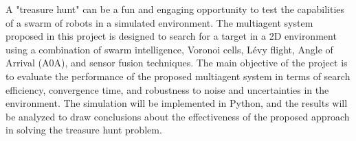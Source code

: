 A "treasure hunt" can be a fun and engaging opportunity to test the capabilities of a swarm of robots in a simulated environment. The multiagent system proposed in this project is designed to search for a target in a 2D environment using a combination of swarm intelligence, Voronoi cells, Lévy flight, Angle of Arrival (A0A), and sensor fusion techniques. The main objective of the project is to evaluate the performance of the proposed multiagent system in terms of search efficiency, convergence time, and robustness to noise and uncertainties in the environment. The simulation will be implemented in Python, and the results will be analyzed to draw conclusions about the effectiveness of the proposed approach in solving the treasure hunt problem.